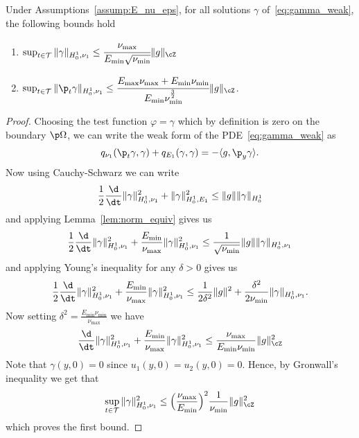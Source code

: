 \documentclass[letterpaper,11pt]{article}
\begin{document}
\begin{proposition}\label{prop:gamma_bounds}
    Under Assumptions~\ref{assump:E_nu_eps}, for all solutions $\gamma$ of~\eqref{eq:gamma_weak}, the following bounds hold
    \begin{enumerate}[label=(\alph*)]
        \item $\sup_{t \in \mathcal{T}}\|\gamma\|_{H_0^1, \nu_1} \leq \cfrac{\nu_{\max}}{E_{\min}\sqrt{\nu_{\min}}}\|g\|_\cZ$
        \item $\sup_{t \in \mathcal{T}}\|\p_t\gamma\|_{H_0^1, \nu_1} \leq \cfrac{E_{\max}\nu_{\max} + E_{\min}\nu_{\min}}{E_{\min}\nu_{\min}^\frac{3}{2}}\|g\|_\cZ$.
    \end{enumerate}
\end{proposition}
\begin{proof}
Choosing the test function $\varphi = \gamma$ which by definition is zero on the boundary $\p\Omega$, we can write the weak form of the PDE~\eqref{eq:gamma_weak} as
\begin{align*}
    q_{\nu_1}(\p_t\gamma, \gamma) + q_{E_1}(\gamma, \gamma) = -\langle g, \p_y\gamma\rangle.
\end{align*}
Now using Cauchy-Schwarz we can write
\begin{align*}
    \frac{1}{2}\frac{\d}{\dt}\|\gamma\|_{H_0^1, \nu_1}^2 + \|\gamma\|_{H_0^1, E_1}^2 \leq \|g\|\|\gamma\|_{H_0^1}
\end{align*}
and applying Lemma~\ref{lem:norm_equiv} gives us
\begin{align*}
    \frac{1}{2}\frac{\d}{\dt}\|\gamma\|_{H_0^1, \nu_1}^2 + \frac{E_{\min}}{\nu_{\max}}\|\gamma\|_{H_0^1, \nu_1}^2 \leq \frac{1}{\sqrt{\nu_{\min}}}\|g\|\|\gamma\|_{H_0^1, \nu_1}
\end{align*}
and applying Young's inequality for any $\delta > 0$ gives us
\begin{align*}
    \frac{1}{2}\frac{\d}{\dt}\|\gamma\|_{H_0^1, \nu_1}^2 + \frac{E_{\min}}{\nu_{\max}}\|\gamma\|_{H_0^1, \nu_1}^2 \leq \frac{1}{2\delta^2}\|g\|^2 + \frac{\delta^2}{2\nu_{\min}}\|\gamma\|_{H_0^1, \nu_1}.
\end{align*}
Now setting $\delta^2 = \frac{E_{\min}\nu_{\min}}{\nu_{\max}}$ we have
\begin{align*}
    \frac{\d}{\dt}\|\gamma\|_{H_0^1, \nu_1}^2 + \frac{E_{\min}}{\nu_{\max}}\|\gamma\|_{H_0^1, \nu_1}^2 \leq \frac{\nu_{\max}}{E_{\min}\nu_{\min}}\|g\|_\cZ^2
\end{align*}
Note that $\gamma(y, 0) = 0$ since $u_1(y, 0) = u_2(y, 0) = 0$. Hence, by Gronwall's inequality we get that
\begin{equation}\label{eq:gamma_bound}
    \sup_{t \in \mathcal{T}}\|\gamma\|_{H_0^1, \nu_1}^2 \leq \Big(\frac{\nu_{\max}}{E_{\min}}\Big)^2\frac{1}{\nu_{\min}}\|g\|_\cZ^2
\end{equation}
which proves the first bound.


\end{proof}
\end{document}
